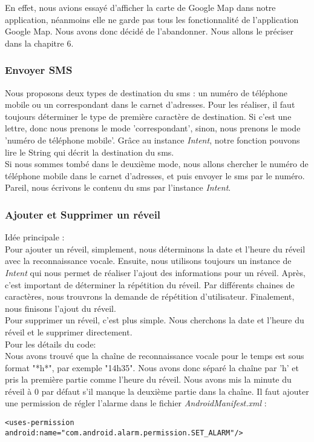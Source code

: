 \indent En effet, nous avions essayé d'afficher la carte de Google Map dans notre application, néanmoins elle ne garde pas tous les fonctionnalité de l'application Google Map. Nous avons donc décidé de l'abandonner. Nous allons le préciser dans la chapitre 6.\\

\subsubsection{Envoyer SMS}
\indent Nous proposons deux types de destination du sms : un numéro de téléphone mobile ou un correspondant dans le carnet d'adresses.  Pour les réaliser, il faut toujours déterminer le type de première caractère de destination. Si c'est une lettre, donc nous prenons le mode 'correspondant', sinon, nous prenons le mode 'numéro de téléphone mobile'. Grâce au instance \emph{Intent}, notre fonction pouvons lire le String qui décrit la destination du sms. \\

\indent Si nous sommes tombé dans le deuxième mode, nous allons chercher le numéro de téléphone mobile dans le carnet d'adresses, et puis envoyer le sms par le numéro.\\

\indent Pareil, nous écrivons le contenu du sms par l'instance \emph{Intent}.
	
\subsubsection{Ajouter et Supprimer un réveil}
\indent Idée principale : \\
\indent Pour ajouter un réveil, simplement, nous déterminons la date et l'heure du réveil avec la reconnaissance vocale. Ensuite, nous utilisons toujours un instance de \emph{Intent} qui nous permet de réaliser l'ajout des informations pour un réveil. Après, c'est important de déterminer la répétition du réveil. Par différents chaines de caractères, nous trouvrons la demande de répétition d'utilisateur. Finalement, nous finisons l'ajout du réveil.\\

\indent Pour supprimer un réveil, c'est plus simple. Nous cherchons la date et l'heure du réveil et le supprimer directement.\\

\indent Pour les détails du code: \\
Nous avons trouvé que la chaîne de reconnaissance vocale pour le temps est sous format "*h*", par exemple "14h35". Nous avons donc séparé la chaîne par 'h' et pris la première partie comme l'heure du réveil. Nous avons mis la minute du réveil à 0 par défaut s'il manque la deuxième partie dans la chaîne. Il faut ajouter une permission de régler l'alarme dans le fichier \emph{AndroidManifest.xml} : \\
	\begin{lstlisting}[frame=none,aboveskip=-1em]
	<uses-permission android:name="com.android.alarm.permission.SET_ALARM"/>
	\end{lstlisting}

